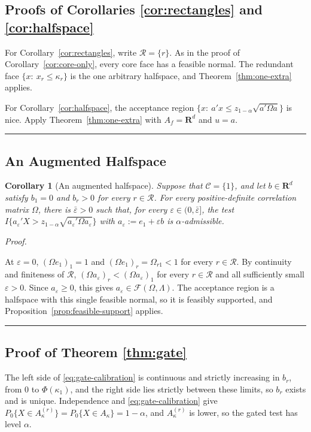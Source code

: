 \documentclass[11pt]{article}
\numberwithin{equation}{section}
\def\qed{\rule{2mm}{2mm}}
\newtheorem{corollary}{Corollary}
\theoremstyle{definition}
\begin{document}
\subsection{Proofs of Corollaries \ref{cor:rectangles} and \ref{cor:halfspace}}

For Corollary~\ref{cor:rectangles}, write $\mathcal R=\{r\}$. As in the proof of Corollary~\ref{cor:core-only}, every core face has a feasible normal. The redundant face $\{x:\ x_r\le\kappa_r\}$ is the one arbitrary halfspace, and Theorem~\ref{thm:one-extra} applies.

For Corollary~\ref{cor:halfspace}, the acceptance region $\{x:\ a'x\le z_{1-\alpha}\sqrt{a'\Omega a}\}$ is nice. Apply Theorem~\ref{thm:one-extra} with $A_f=\mathbf R^d$ and $u=a$. \qed

\subsection{An Augmented Halfspace}\label{app:augmented-halfspace}

\begin{corollary}[An augmented halfspace]\label{cor:epsilon}
  Suppose that $\mathcal C=\{1\}$, and let $b\in\mathbf R^d$ satisfy $b_1=0$ and $b_r>0$ for every $r\in\mathcal R$. For every positive-definite correlation matrix $\Omega$, there is $\bar\varepsilon>0$ such that, for every $\varepsilon\in(0,\bar\varepsilon]$, the test $I\{a_\varepsilon'X>z_{1-\alpha}\sqrt{a_\varepsilon'\Omega a_\varepsilon}\}$ with $a_\varepsilon:=e_1+\varepsilon b$ is $\alpha$-admissible.
  \end{corollary}

\noindent\emph{Proof.}

At $\varepsilon=0$, $(\Omega e_1)_1=1$ and $(\Omega e_1)_r=\Omega_{r1}<1$ for every $r\in\mathcal R$. By continuity and finiteness of $\mathcal R$, $(\Omega a_\varepsilon)_r<(\Omega a_\varepsilon)_1$ for every $r\in\mathcal R$ and all sufficiently small $\varepsilon>0$. Since $a_\varepsilon\ge0$, this gives $a_\varepsilon\in\mathcal F(\Omega,\Lambda)$. The acceptance region is a halfspace with this single feasible normal, so it is feasibly supported, and Proposition~\ref{prop:feasible-support} applies. \qed

\subsection{Proof of Theorem \ref{thm:gate}}

The left side of \eqref{eq:gate-calibration} is continuous and strictly increasing in $b_r$, from $0$ to $\Phi(\kappa_1)$, and the right side lies strictly between these limits, so $b_r$ exists and is unique. Independence and \eqref{eq:gate-calibration} give $P_0\{X\in A_\kappa^{(r)}\}=P_0\{X\in A_\kappa\}=1-\alpha$, and $A_\kappa^{(r)}$ is lower, so the gated test has level $\alpha$.
\end{document}
